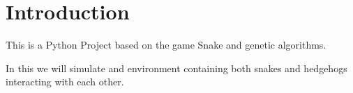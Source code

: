 \chapter{Introduction}
\label{chap:introduction}
This is a Python Project based on the game Snake and genetic algorithms.

In this we will simulate and environment containing both snakes and hedgehogs interacting with each other.

